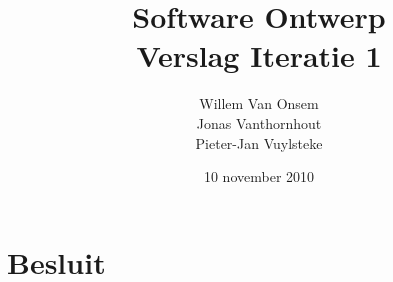 \documentclass[a4paper, titlepage, 12pt]{article}
\title{Software Ontwerp \\ \Large Verslag Iteratie 1}
\author{Willem Van Onsem\\Jonas Vanthornhout\\Pieter-Jan Vuylsteke}
\date{10 november 2010}
\begin{document}
\begin{titlepage}
\maketitle
\end{titlepage}

\tableofcontents

\newpage


\newpage


\newpage


\newpage


\newpage


\newpage


\newpage
\section{Besluit}
\label{besluit}
\newpage
\nocite{*}


\end{document}
